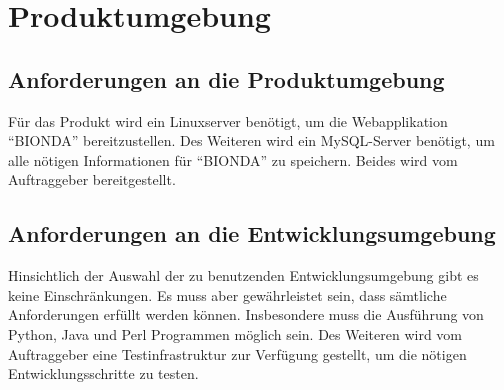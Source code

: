 \chapter*{Produktumgebung}


\section*{Anforderungen an die Produktumgebung}
Für das Produkt wird ein Linuxserver benötigt, um die Webapplikation \enquote{BIONDA} bereitzustellen. Des Weiteren wird ein MySQL-Server benötigt, um alle nötigen Informationen für \enquote{BIONDA} zu speichern. Beides wird vom Auftraggeber bereitgestellt. 


\section*{Anforderungen an die Entwicklungsumgebung}
Hinsichtlich der Auswahl der zu benutzenden Entwicklungsumgebung gibt es keine Einschränkungen. Es muss aber gewährleistet sein, dass sämtliche Anforderungen erfüllt werden können. Insbesondere muss die Ausführung von Python, Java und Perl Programmen möglich sein. Des Weiteren wird vom Auftraggeber eine Testinfrastruktur zur Verfügung gestellt, um die nötigen Entwicklungsschritte zu testen. 
